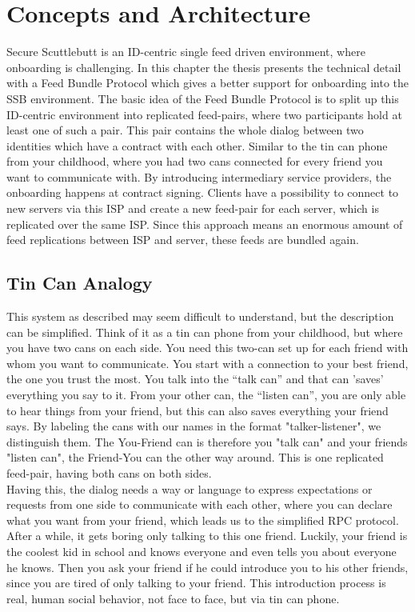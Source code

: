 \chapter{Concepts and Architecture}
Secure Scuttlebutt is an ID-centric single feed driven environment, where onboarding is challenging. 
In this chapter the thesis presents the technical detail with a Feed Bundle Protocol which gives a better support for onboarding into the SSB environment. The basic idea of the Feed Bundle Protocol is to split up this ID-centric environment into replicated feed-pairs, where two participants hold at least one of such a pair.  This pair contains the whole dialog between two identities which have a contract with each other. Similar to the tin can phone from your childhood, where you had two cans connected for every friend you want to communicate with. By introducing intermediary service providers, the onboarding happens at contract signing. Clients have a possibility to connect to new servers via this ISP and create a new feed-pair for each server, which is replicated over the same ISP. Since this approach means an enormous amount of feed replications between ISP and server, these feeds are bundled again.

\section{Tin Can Analogy}

This system as described may seem difficult to understand, but the description can be simplified. Think of it as a tin can phone from your childhood, but where you have two cans on each side. You need this two-can set up for each friend with whom you want to communicate. You start with a connection to your best friend, the one you trust the most. You talk into the “talk can” and that can ’saves’ everything you say to it. From your other can, the “listen can”, you are only able to hear things from your friend, but this can also saves everything your friend says. By labeling the cans with our names in the format "talker-listener", we distinguish them. The You-Friend can is therefore you "talk can" and your friends "listen can", the Friend-You can the other way around. This is one replicated feed-pair, having both cans on both sides.
\\

Having this, the dialog needs a way or language to express expectations or requests from one side to communicate with each other, where you can declare what you want from your friend, which leads us to the simplified RPC protocol. After a while, it gets boring only talking to this one friend. Luckily, your friend is the coolest kid in school and knows everyone and even tells you about everyone he knows. Then you ask your friend if he could introduce you to his other friends, since you are tired of only talking to your friend. This introduction process is real, human social behavior, not face to face, but via tin can phone.
\\

